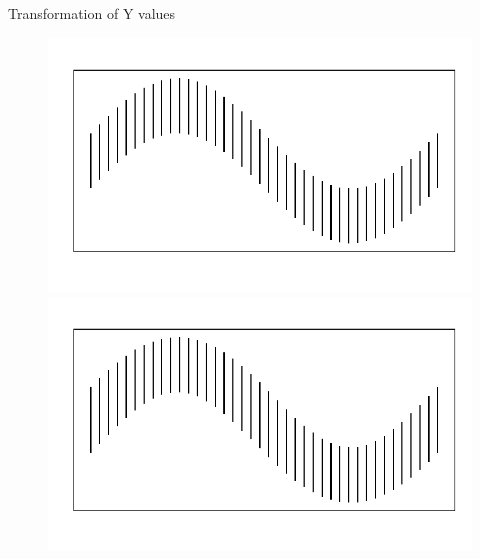 \documentclass[11pt]{article}\usepackage{graphicx, color}
\begin{document}
\begin{subsection}{Transformation of Y values}
\begin{figure}[htbp]
\end{figure}
% 
% 


\begin{figure}[hbtp]


{\centering \includegraphics[width=.49\textwidth]{figure/fig-fixingit1} 
\includegraphics[width=.49\textwidth]{figure/fig-fixingit2} 

}
\end{figure}
\end{subsection}
\end{document}
